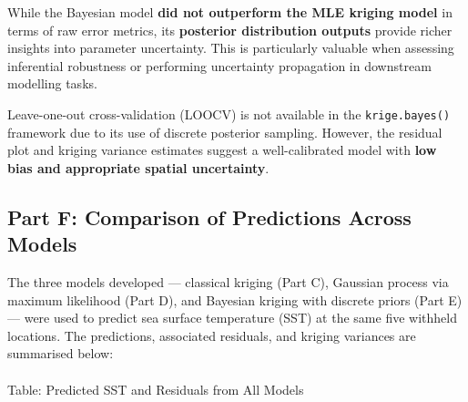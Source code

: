 \documentclass[
  11pt,
]{article}
\makeatletter
\let\oldparagraph\paragraph
\renewcommand{\paragraph}{
    \@ifstar
      \xxxParagraphStar
      \xxxParagraphNoStar
  }
\newcommand{\xxxParagraphStar}[1]{\oldparagraph*{#1}\mbox{}}
\newcommand{\xxxParagraphNoStar}[1]{\oldparagraph{#1}\mbox{}}
\makeatother
\begin{document}
While the Bayesian model \textbf{did not outperform the MLE kriging
model} in terms of raw error metrics, its \textbf{posterior distribution
outputs} provide richer insights into parameter uncertainty. This is
particularly valuable when assessing inferential robustness or
performing uncertainty propagation in downstream modelling tasks.

Leave-one-out cross-validation (LOOCV) is not available in the
\texttt{krige.bayes()} framework due to its use of discrete posterior
sampling. However, the residual plot and kriging variance estimates
suggest a well-calibrated model with \textbf{low bias and appropriate
spatial uncertainty}.

\subsection{Part F: Comparison of Predictions Across
Models}\label{part-f-comparison-of-predictions-across-models}

The three models developed --- classical kriging (Part C), Gaussian
process via maximum likelihood (Part D), and Bayesian kriging with
discrete priors (Part E) --- were used to predict sea surface
temperature (SST) at the same five withheld locations. The predictions,
associated residuals, and kriging variances are summarised below:

\paragraph{Table: Predicted SST and Residuals from All
Models}\label{table-predicted-sst-and-residuals-from-all-models}
\end{document}
